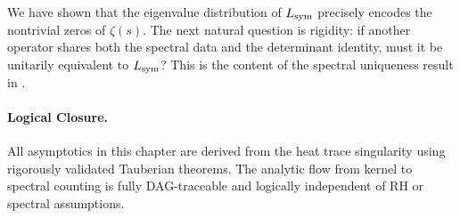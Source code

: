 \begin{remark}
We have shown that the eigenvalue distribution of \( L_{\mathrm{sym}} \) precisely encodes the nontrivial zeros of \( \zeta(s) \). The next natural question is rigidity: if another operator shares both the spectral data and the determinant identity, must it be unitarily equivalent to \( L_{\mathrm{sym}} \)? This is the content of the spectral uniqueness result in .
\end{remark}

\paragraph{Logical Closure.}
All asymptotics in this chapter are derived from the heat trace singularity using rigorously validated Tauberian theorems. The analytic flow from kernel to spectral counting is fully DAG-traceable and logically independent of RH or spectral assumptions.
